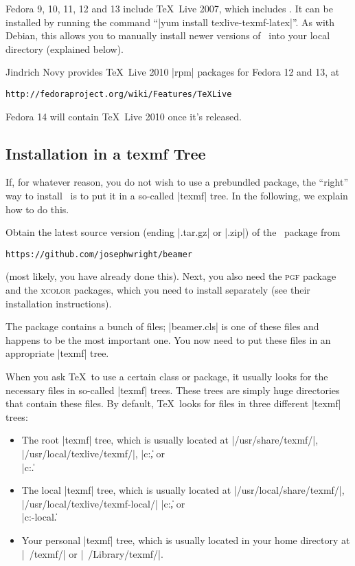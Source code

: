Fedora 9, 10, 11, 12 and 13 include \TeX\ Live 2007, which includes \beamer. It can be installed by running the command ``|yum install texlive-texmf-latex|''. As with Debian, this allows you to manually install newer versions of \beamer\ into your local directory (explained below).

Jindrich Novy provides \TeX\ Live 2010 |rpm| packages for Fedora 12 and 13, at
\begin{verbatim}
http://fedoraproject.org/wiki/Features/TeXLive
\end{verbatim}
Fedora 14 will contain \TeX\ Live 2010 once it's released.


\subsection{Installation in a texmf Tree}

If, for whatever reason, you do not wish to use a prebundled package, the ``right'' way to install \beamer\ is to put it in a so-called |texmf| tree. In the following, we explain how to do this.

Obtain the latest source version (ending |.tar.gz| or |.zip|) of the \beamer\ package from
\begin{verbatim}
https://github.com/josephwright/beamer
\end{verbatim}
(most likely, you have already done this). Next, you also need the \textsc{pgf} package and the \textsc{xcolor} packages, which you need to install separately (see their installation instructions).

The package contains a bunch of files; |beamer.cls| is one of these files and happens to be the most important one. You now need to put these files in an appropriate |texmf| tree.

When you ask \TeX\ to use a certain class or package, it usually looks for the necessary files in so-called |texmf| trees. These trees are simply huge directories that contain these files. By default, \TeX\ looks for files in three different |texmf| trees:
\begin{itemize}
\item
  The root |texmf| tree, which is usually located at |/usr/share/texmf/|, |/usr/local/texlive/texmf/|, |c:\texmf\|, or\\ |c:\texlive\texmf\|.
\item
  The local  |texmf| tree, which is usually located at |/usr/local/share/texmf/|, |/usr/local/texlive/texmf-local/| |c:\localtexmf\|, or\\ |c:\texlive\texmf-local\|.
\item
  Your personal |texmf| tree, which is usually located in your home directory at |~/texmf/| or |~/Library/texmf/|.
\end{itemize}

